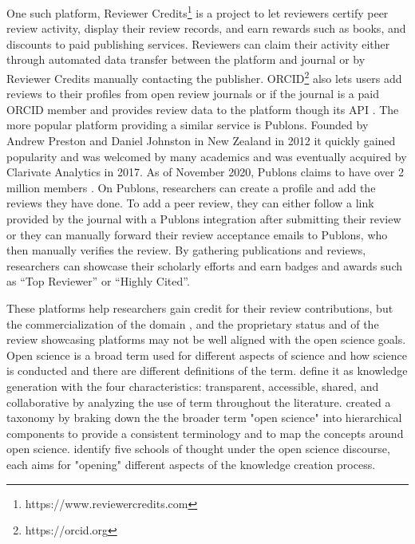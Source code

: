 One such platform, Reviewer Credits\footnote{https://www.reviewercredits.com} is a project to let reviewers certify peer review activity, display their review records, and earn rewards such as books, and discounts to paid publishing services. Reviewers can claim their activity either through automated data transfer between the platform and journal or by Reviewer Credits manually contacting the publisher. \acrshort{ORCID}\footnote{https://orcid.org} also lets users add reviews to their profiles from open review journals or if the journal is a paid \acrshort{ORCID} member and provides review data to the platform though its \acrshort{API} \parencite{therese_2018}. The more popular platform providing a similar service is Publons. Founded by Andrew Preston and Daniel Johnston in New Zealand in 2012 it quickly gained popularity and was welcomed by many academics \parencite[266]{Smith.2015} and was eventually acquired by Clarivate Analytics in 2017. As of November 2020, Publons claims to have over 2 million members \parencite{publons_2020}. On Publons, researchers can create a profile and add the reviews they have done. To add a peer review, they can either follow a link provided by the journal with a Publons integration after submitting their review or they can manually forward their review acceptance emails to Publons, who then manually verifies the review. By gathering publications and reviews, researchers can showcase their scholarly efforts and earn badges and awards such as “Top Reviewer” or “Highly Cited”. 

These platforms help researchers gain credit for their review contributions, but the commercialization of the domain \parencite[14]{Tennant.2017}, and the proprietary status and of the review showcasing platforms may not be well aligned with the open science goals. Open science is a broad term used for different aspects of science and how science is conducted and there are different definitions of the term. \cite{VicenteSaez.2018} define it as knowledge generation with the four characteristics: transparent, accessible, shared, and collaborative by analyzing the use of term throughout the literature. \cite{Pontika.2015} created a taxonomy by braking down the the broader term "open science" into hierarchical components to provide a consistent terminology and to map the concepts around open science. \cite{Fecher.2013} identify five  schools of thought under the open science discourse, each aims for "opening" different aspects of the knowledge creation process. 

